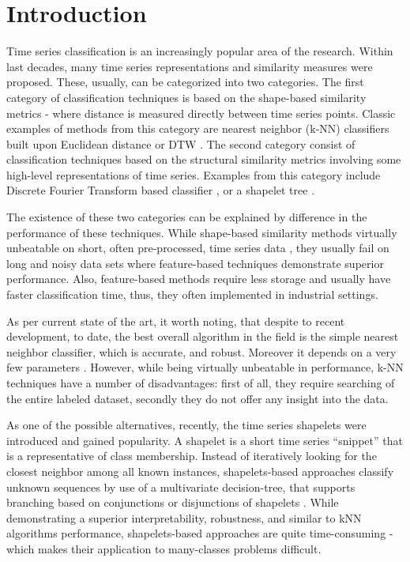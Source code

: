 \documentclass{llncs}
\begin{document}
\section{Introduction}
%
Time series classification is an increasingly popular area of the research. Within last decades,
many time series representations and similarity measures were proposed. These, usually, can be
categorized into two categories. The first category of classification techniques is based on the
shape-based similarity metrics - where distance is measured directly between time series
points. Classic examples of methods from this category are nearest neighbor (k-NN) classifiers
built upon Euclidean distance or DTW \cite{1NN}. The second category consist of classification
techniques based on the structural similarity metrics involving some high-level representations
of time series. Examples from this category include Discrete Fourier Transform based classifier
\cite{DFT}, or a shapelet tree \cite{shapelet}.

The existence of these two categories can be explained by difference in the performance of these
techniques. While shape-based similarity methods virtually unbeatable on short, often pre-processed,
time series data \cite{benchmark}, they usually fail on long and noisy data sets \cite{indexing}
where feature-based techniques demonstrate superior performance. Also, feature-based methods
require less storage and usually have faster classification time, thus, they often implemented in
industrial settings. 

As per current state of the art, it worth noting, that despite to recent development, to date, the
best overall algorithm in the field is the simple nearest neighbor classifier, which is accurate,
and robust. Moreover it depends on a very few parameters \cite{comparison}
\cite{classifiers} \cite{benchmark}. However, while being virtually unbeatable in performance,
k-NN techniques have a number of disadvantages: first of all, they require searching of the
entire labeled dataset, secondly they do not offer any insight into the data. 

As one of the possible
alternatives, recently, the time series shapelets were introduced \cite{shapelet} and gained
popularity. A shapelet is a short time series ``snippet'' that is a representative of class
membership. Instead of iteratively looking for the closest neighbor among all known instances,
shapelets-based approaches classify unknown sequences by use of a multivariate decision-tree, that
supports branching based on conjunctions or disjunctions of shapelets \cite{logical}. While
demonstrating a superior interpretability, robustness, and similar to kNN algorithms performance,
shapelets-based approaches are quite time-consuming - which makes their application to many-classes
problems difficult. 
\end{document}
